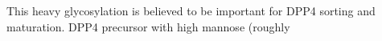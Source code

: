 This heavy glycosylation is believed to be important for DPP4 sorting and maturation. DPP4 precursor with high mannose (roughly 